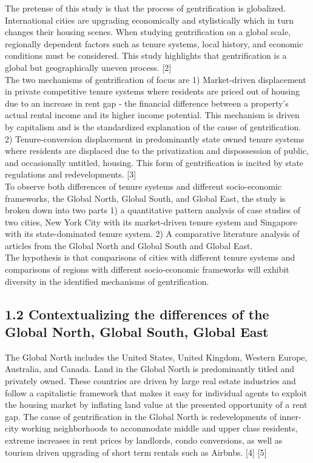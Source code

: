 \documentclass[12pt]{article}
\begin{document}
The pretense of this study is that the process of gentrification is globalized. International cities are upgrading economically and stylistically which in turn changes their housing scenes. When studying gentrification on a global scale, regionally dependent factors such as tenure systems, local history, and economic conditions must be considered. This study highlights that gentrification is a global but geographically uneven process. [2] \\ 

The two mechanisms of gentrification of focus are 1) Market-driven displacement in private competitive tenure systems where residents are priced out of housing due to an increase in rent gap - the financial difference between a property's actual rental income and its higher income potential. This mechanism is driven by capitalism and is the standardized explanation of the cause of gentrification. 2) Tenure-conversion displacement in predominantly state owned tenure systems where residents are displaced due to the privatization and dispossession of public, and occasionally untitled, housing. This form of gentrification is incited by state regulations and redevelopments. [3] \\ 

To observe both differences of tenure systems and different socio-economic frameworks, the Global North, Global South, and Global East, the study is broken down into two parts 1) a quantitative pattern analysis of case studies of two cities, New York City with its market-driven tenure system and Singapore with its state-dominated tenure system. 2) A comparative literature analysis of articles from the Global North and Global South and Global East. \\

The hypothesis is that comparisons of cities with different tenure systems and comparisons of regions with different socio-economic frameworks will exhibit diversity in the identified mechanisms of gentrification.
\\

\subsection*{1.2 Contextualizing the differences of the Global North, Global South, Global East} 
The Global North includes the United States, United Kingdom, Western Europe, Australia, and Canada. Land in the Global North is predominantly titled and privately owned. These countries are driven by large real estate industries and follow a capitalistic framework that makes it easy for individual agents to exploit the housing market by inflating land value at the presented opportunity of a rent gap. The cause of gentrification in the Global North is redevelopments of inner-city working neighborhoods to accommodate middle and upper class residents, extreme increases in rent prices by landlords, condo conversions, as well as tourism driven upgrading of short term rentals such as Airbnbs. [4] [5] \\ 
\end{document}
